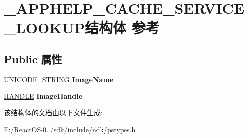 \hypertarget{struct___a_p_p_h_e_l_p___c_a_c_h_e___s_e_r_v_i_c_e___l_o_o_k_u_p}{}\section{\+\_\+\+A\+P\+P\+H\+E\+L\+P\+\_\+\+C\+A\+C\+H\+E\+\_\+\+S\+E\+R\+V\+I\+C\+E\+\_\+\+L\+O\+O\+K\+U\+P结构体 参考}
\label{struct___a_p_p_h_e_l_p___c_a_c_h_e___s_e_r_v_i_c_e___l_o_o_k_u_p}
\subsection*{Public 属性}
\begin{DoxyCompactItemize}
\item 
\mbox{\label{struct___a_p_p_h_e_l_p___c_a_c_h_e___s_e_r_v_i_c_e___l_o_o_k_u_p_a4c7328ddb0af700c9555497a5d4d8f45}} 
\hyperlink{struct___u_n_i_c_o_d_e___s_t_r_i_n_g}{U\+N\+I\+C\+O\+D\+E\+\_\+\+S\+T\+R\+I\+NG} {\bfseries Image\+Name}
\item 
\mbox{\label{struct___a_p_p_h_e_l_p___c_a_c_h_e___s_e_r_v_i_c_e___l_o_o_k_u_p_adc08604b3a4ad7ba501fe2c3304ee3cb}} 
\hyperlink{interfacevoid}{H\+A\+N\+D\+LE} {\bfseries Image\+Handle}
\end{DoxyCompactItemize}


该结构体的文档由以下文件生成\+:\begin{DoxyCompactItemize}
\item 
E\+:/\+React\+O\+S-\/0../sdk/include/ndk/pstypes.\+h\end{DoxyCompactItemize}

